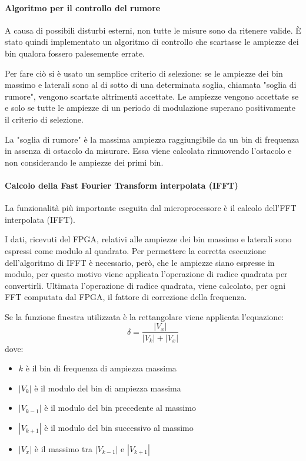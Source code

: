 \paragraph{Algoritmo per il controllo del rumore}
A causa di possibili disturbi esterni, non tutte le misure sono da ritenere valide. È stato quindi implementato un algoritmo di controllo che scartasse le ampiezze dei bin qualora fossero palesemente errate.

Per fare ciò si è usato un semplice criterio di selezione: se le ampiezze dei bin massimo e laterali sono al di sotto di una determinata soglia, chiamata "soglia di rumore", vengono scartate altrimenti accettate. Le ampiezze vengono accettate se e solo se tutte le ampiezze di un periodo di modulazione superano positivamente il criterio di selezione.

La "soglia di rumore" è la massima ampiezza raggiungibile da un bin di frequenza in assenza di ostacolo da misurare. Essa viene calcolata rimuovendo l'ostacolo e non considerando le ampiezze dei primi bin.

\paragraph{Calcolo della Fast Fourier Transform interpolata (IFFT)}
La funzionalità più importante eseguita dal microprocessore è il calcolo dell'FFT interpolata (IFFT). 

I dati, ricevuti del FPGA, relativi alle ampiezze dei bin massimo e laterali sono espressi come modulo al quadrato. Per permettere la corretta esecuzione dell'algoritmo di IFFT è necessario, però, che le ampiezze siano espresse in modulo, per questo motivo viene applicata l'operazione di radice quadrata per convertirli.
Ultimata l'operazione di radice quadrata, viene calcolato, per ogni FFT computata dal FPGA, il fattore di correzione della frequenza.

Se la funzione finestra utilizzata è la rettangolare viene applicata l'equazione:
\begin{equation}
	\delta = \frac{|V_{x}|}{|V_{k}|+|V_{x}|}
\end{equation}
dove:
\begin{itemize}
	\item $k$ è il bin di frequenza di ampiezza massima
	\item $|V_k|$ è il modulo del bin di ampiezza massima
	\item $|V_{k-1}|$ è il modulo del bin precedente al massimo
	\item $|V_{k+1}|$ è il modulo del bin successivo al massimo
	\item $|V_x|$ è il massimo tra $|V_{k-1}|$ e $|V_{k+1}|$ 
\end{itemize}

